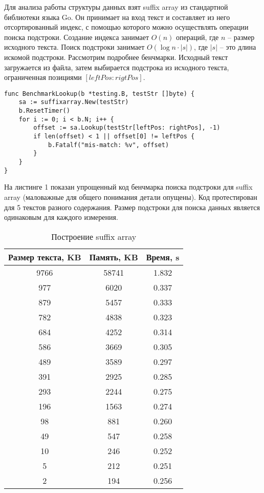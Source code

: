 
Для анализа работы структуры данных взят suffix array из стандартной библиотеки языка Go.
Он принимает на вход текст и составляет из него отсортированный индекс, с помощью которого можно осуществлять
операции поиска подстроки. Создание индекса занимает $O(n)$ операций, где $n$ -- размер исходного текста.
Поиск подстроки занимает $O(\log n \cdot |s|)$, где $|s|$ -- это длина искомой подстроки.
Рассмотрим подробнее бенчмарки. Исходный текст загружается из файла, затем выбирается подстрока
из исходного текста, ограниченная позициями $[leftPos:rigtPos]$.

\begin{lstlisting}[caption=Suffix array example]
func BenchmarkLookup(b *testing.B, testStr []byte) {
    sa := suffixarray.New(testStr)
    b.ResetTimer()
    for i := 0; i < b.N; i++ {
        offset := sa.Lookup(testStr[leftPos: rightPos], -1)
        if len(offset) < 1 || offset[0] != leftPos {
            b.Fatalf("mis-match: %v", offset)
        }
    }
}
\end{lstlisting}

На листинге 1 показан упрощенный код бенчмарка поиска подстроки для suffix array
(маловажные для общего понимания детали опущены). Код протестирован для 5 текстов разного содержания.
Размер подстроки для поиска данных является одинаковым для каждого измерения.

\begin{table}[h!]
    \centering
    \begin{tabular}{|c|c|c|}
        \hline
        Размер текста, KB & Память, KB & Время, s\\
        \hline
        9766 & 58741 & 1.832\\
        \hline
        977 & 6020 & 0.337\\
        \hline
        879 & 5457 & 0.333\\
        \hline
        782 & 4838 & 0.323\\
        \hline
        684 & 4252 & 0.314\\
        \hline
        586 & 3669 & 0.305\\
        \hline
        489 & 3589 & 0.297\\
        \hline
        391 & 2925 & 0.285\\
        \hline
        293 & 2244 & 0.275\\
        \hline
        196 & 1563 & 0.274\\
        \hline
        98 & 881 & 0.260\\
        \hline
        49 & 547 & 0.258\\
        \hline
        10 & 246 & 0.252\\
        \hline
        5 & 212 & 0.251\\
        \hline
        2 & 194 & 0.256\\
        \hline
    \end{tabular}
    \caption{Построение suffix array}
    \label{table:2}
\end{table}

